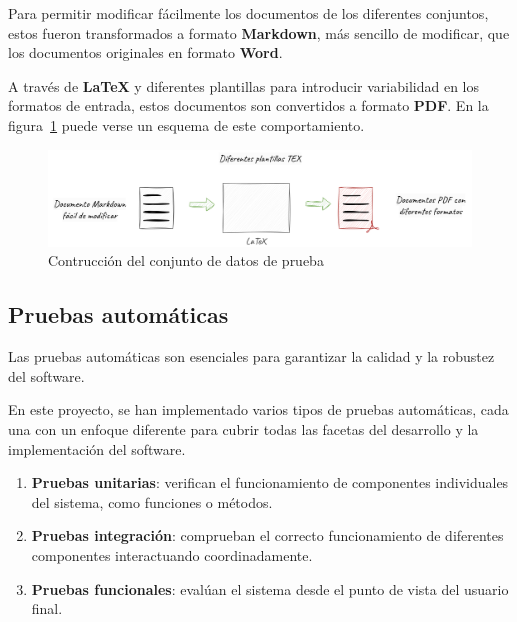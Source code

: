 Para permitir modificar fácilmente los documentos de los diferentes conjuntos, estos fueron transformados a formato
\textbf{Markdown}, más sencillo de modificar, que los documentos originales en formato \textbf{Word}.

A través de \textbf{LaTeX} y diferentes plantillas para introducir variabilidad en los formatos de entrada, estos
documentos son convertidos a formato \textbf{PDF}.
En la figura~\ref{fig:chapter_4.5.dataset_construction_overview} puede verse un esquema de este comportamiento.

\begin{figure}[ht]
    \begin{center}
        \includegraphics[width=\textwidth]{./chapter/4/images/chapter_4.5.dataset_construction_overview}
        \caption{Contrucción del conjunto de datos de prueba}
        \label{fig:chapter_4.5.dataset_construction_overview}
    \end{center}
\end{figure}


\subsection*{Pruebas automáticas}

Las pruebas automáticas son esenciales para garantizar la calidad y la robustez del software.

En este proyecto, se han implementado varios tipos de pruebas automáticas, cada una con un enfoque diferente para cubrir
todas las facetas del desarrollo y la implementación del software.

\begin{enumerate}
    \item \textbf{Pruebas unitarias}: verifican el funcionamiento de componentes individuales del sistema, como
    funciones o métodos.
    \item \textbf{Pruebas integración}: comprueban el correcto funcionamiento de diferentes componentes
    interactuando coordinadamente.
    \item \textbf{Pruebas funcionales}: evalúan el sistema desde el punto de vista del usuario final.
\end{enumerate}

